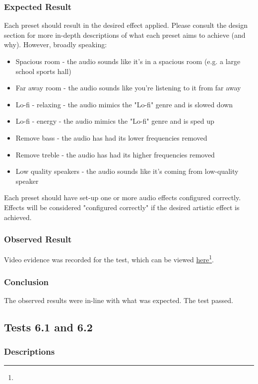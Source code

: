\subsubsection*{Expected Result}
Each preset should result in the desired effect applied. Please consult the design section for more in-depth descriptions of what each preset aims to achieve (and why). However, broadly speaking:
\begin{itemize}
	\item Spacious room - the audio sounds like it's in a spacious room (e.g. a large school sports hall)
	\item Far away room - the audio sounds like you're listening to it from far away
	\item Lo-fi - relaxing - the audio mimics the "Lo-fi" genre and is slowed down
	\item Lo-fi - energy - the audio mimics the "Lo-fi" genre and is sped up
	\item Remove bass - the audio has had its lower frequencies removed
	\item Remove treble - the audio has had its higher frequencies removed
	\item Low quality speakers - the audio sounds like it's coming from low-quality speaker
\end{itemize}
Each preset should have set-up one or more audio effects configured correctly. Effects will be considered "configured correctly" if the desired artistic effect is achieved.

\subsubsection*{Observed Result}
\label{sec:evidence5.4}
Video evidence was recorded for the test, which can be viewed \href{}{here}\footnote{

}.

\subsubsection*{Conclusion}
The observed results were in-line with what was expected. The test passed.


\pagebreak
\subsection{Tests 6.1 and 6.2}
\subsubsection*{Descriptions}
